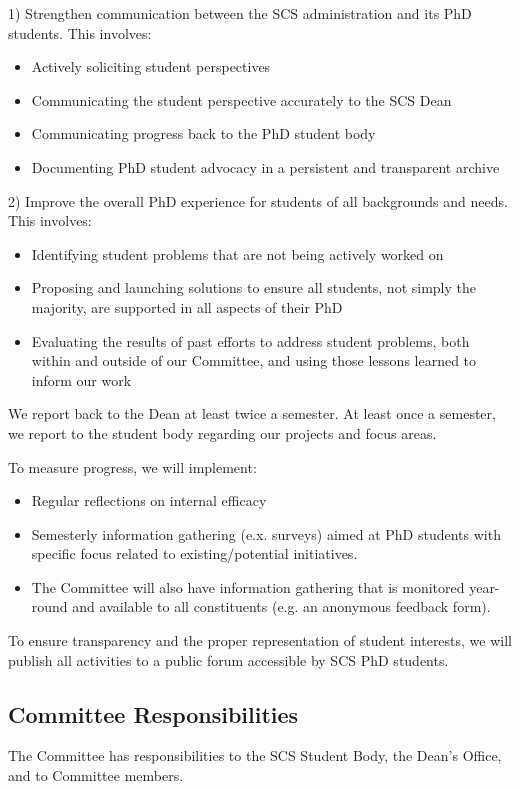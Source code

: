 \documentclass{article}
\begin{document}
1) Strengthen communication between the SCS administration and its PhD students. 
This involves:
\begin{itemize}
    \item Actively soliciting student perspectives
    \item Communicating the student perspective accurately to the SCS Dean
    \item Communicating progress back to the PhD student body 
    \item Documenting PhD student advocacy in a persistent and transparent archive
\end{itemize}



2) Improve the overall PhD experience for students of all backgrounds and needs. 
This involves:
\begin{itemize}
    \item Identifying student problems that are not being actively worked on
    \item Proposing and launching solutions to ensure all students, not simply the majority, are supported in all aspects of their PhD
    \item Evaluating the results of past efforts to address student problems, both within and outside of our Committee, and using those lessons learned to inform our work
\end{itemize}


We report back to the Dean at least twice a semester. At least once a semester, we report to the student body regarding our projects and focus areas.

To measure progress, we will implement:
\begin{itemize}
    \item Regular reflections on internal efficacy
    \item Semesterly information gathering (e.x. surveys) aimed at PhD students with specific focus related to existing/potential initiatives.
    \item The Committee will also have information gathering that is monitored year-round and available to all constituents (e.g. an anonymous feedback form). 
\end{itemize}


To ensure transparency and the proper representation of student interests, we will publish all activities to a public forum accessible by SCS PhD students.



\subsection {Committee Responsibilities} \label{sec:responsibilities}
The Committee has responsibilities to the SCS Student Body, the Dean's Office, and to Committee members.
\end{document}
